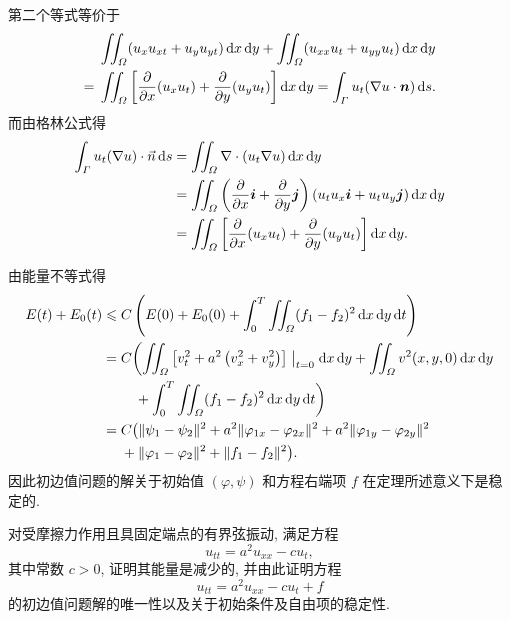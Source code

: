 \begin{note}[教材(6.15)式解释]
  第二个等式等价于
  \begin{align*}
        & \iint_{\varOmega}(u_xu_{xt}+u_yu_{yt})\mathop{}\!\mathrm{d} x\mathop{}\!\mathrm{d} y
          +\iint_{\varOmega}(u_{xx}u_t+u_{yy}u_t)\mathop{}\!\mathrm{d} x\mathop{}\!\mathrm{d} y \\
    ={} & \iint_{\varOmega}\left[\frac{\partial}{\partial x}(u_xu_t)
          +\frac{\partial}{\partial y}(u_yu_t)\right]\mathop{}\!\mathrm{d} x\mathop{}\!\mathrm{d} y
          =\int_{\varGamma}u_t(\nabla u\cdot\bm{n})\mathop{}\!\mathrm{d} s.
  \end{align*}
  而由格林公式得
  \[\begin{split}\int_{\varGamma}u_t(\nabla u)\cdot\vec{n}\mathop{}\!\mathrm{d} s&=\iint_{\varOmega}\nabla\cdot(u_t\nabla u)\mathop{}\!\mathrm{d} x\mathop{}\!\mathrm{d} y\\
  &=\iint_{\varOmega}\left(\frac{\partial}{\partial x}\bm{i}+\frac{\partial}{\partial y}\bm{j}\right)\left(u_tu_x\bm{i}+u_tu_y\bm{j}\right)\mathop{}\!\mathrm{d} x\mathop{}\!\mathrm{d} y\\
  &=\iint_{\varOmega}\left[\frac{\partial}{\partial x}(u_xu_t)+\frac{\partial}{\partial y}(u_yu_t)\right]\mathop{}\!\mathrm{d} x\mathop{}\!\mathrm{d} y.\end{split}\]
\end{note}

\begin{note}[定理6.2]
  由能量不等式得
  \begin{align*}
    E(t)+E_0(t)
    \leq{} & C\left(E(0)+E_0(0)+\int_0^T
      \iint_{\varOmega}(f_1-f_2)^2\diff x\diff y\diff t\right) \\
    ={} & C\biggl(\iint_{\varOmega}\left[v_t^2+a^2\left(v_x^2+v_y^2\right)\right]\bigm|_{t=0}
          \diff x\diff y + \iint_{\varOmega}v^2(x,y,0)\diff x\diff y \\
        & \quad + \int_0^T \iint_{\varOmega}( f_1-f_2)^2\diff x\diff y\diff t\biggr) \\
    ={} & C\bigl(\|\psi_1-\psi_2\|^2+a^2\|\varphi_{1x}-\varphi_{2x}\|^2
          + a^2\|\varphi_{1y}-\varphi_{2y}\|^2 \\
        & + \|\varphi_1-\varphi_2\|^2+\|f_1-f_2\|^2\bigr).
  \end{align*}
  因此初边值问题的解关于初始值 $(\varphi,\psi)$ 和方程右端项 $f$ 在定理所述意义下是稳定的.
\end{note}


\begin{exercise}
  对受摩擦力作用且具固定端点的有界弦振动, 满足方程
  \[u_{tt} = a^2u_{xx} - cu_t,\]
  其中常数 $c>0$, 证明其能量是减少的, 并由此证明方程
  \[u_{tt} = a^2u_{xx} - cu_t + f\]
  的初边值问题解的唯一性以及关于初始条件及自由项的稳定性.
\end{exercise}

